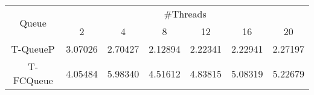 \begin{tabular}{|c|c|c|c|c|c|c|}
\hline
\multirow{2}{*}{Queue} & \multicolumn{6}{c|}{\#Threads}\\\cline{2-7}& 2 & 4 & 8 & 12 & 16 & 20\\
\hline
\hline
T-QueueP & 3.07026 & 2.70427 & 2.12894 & 2.22341 & 2.22941 & 2.27197\\
T-FCQueue & 4.05484 & 5.98340 & 4.51612 & 4.83815 & 5.08319 & 5.22679\\
\hline\end{tabular}
